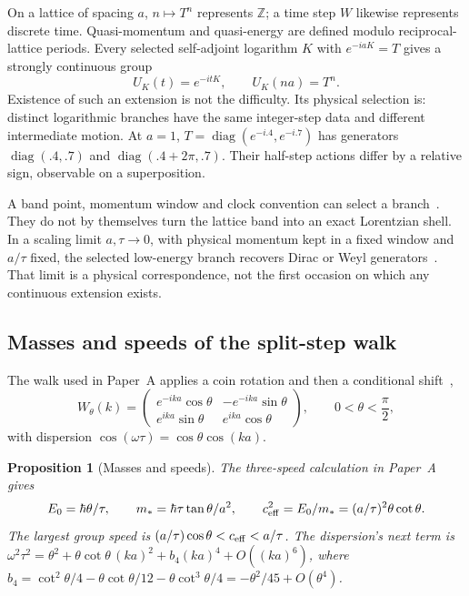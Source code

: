 \documentclass[12pt,a4paper]{article}
\newtheorem{proposition}[theorem]{Proposition}
\theoremstyle{definition}
\theoremstyle{remark}
\begin{document}
On a lattice of spacing $a$, $n\mapsto T^n$ represents $\mathbb Z$; a time step $W$ likewise represents discrete time. Quasi-momentum and quasi-energy are defined modulo reciprocal-lattice periods. Every selected self-adjoint logarithm $K$ with $e^{-iaK}=T$ gives a strongly continuous group
\[
 U_K(t)=e^{-itK},\qquad U_K(na)=T^n .
\]
Existence of such an extension is not the difficulty. Its physical selection is: distinct logarithmic branches have the same integer-step data and different intermediate motion. At $a=1$, $T=\operatorname{diag}(e^{-i.4},e^{-i.7})$ has generators $\operatorname{diag}(.4,.7)$ and $\operatorname{diag}(.4+2\pi,.7)$. Their half-step actions differ by a relative sign, observable on a superposition.

A band point, momentum window and clock convention can select a branch~\cite{Liu2026QRAIFA}. They do not by themselves turn the lattice band into an exact Lorentzian shell. In a scaling limit $a,\tau\to0$, with physical momentum kept in a fixed window and $a/\tau$ fixed, the selected low-energy branch recovers Dirac or Weyl generators~\cite{Strauch2006,BisioDArianoTosini2015,DArianoPerinotti2014}. That limit is a physical correspondence, not the first occasion on which any continuous extension exists.

\subsection{Masses and speeds of the split-step walk}

The walk used in Paper~A applies a coin rotation and then a conditional shift~\cite{Liu2026QRAIFA},
\begin{equation}
W_\theta(k)=\begin{pmatrix}e^{-ika}\cos\theta&-e^{-ika}\sin\theta\\ e^{ika}\sin\theta&e^{ika}\cos\theta\end{pmatrix},\qquad 0<\theta<\frac\pi2 ,
\end{equation}
with dispersion $\cos(\omega\tau)=\cos\theta\cos(ka)$.

\begin{proposition}[Masses and speeds]
\label{prop:walk}
The three-speed calculation in Paper~A~\cite[Proposition on three speeds]{Liu2026QRAIFA} gives
\[
 E_0=\hbar\theta/\tau,\qquad m_*=\hbar\tau\tan\theta/a^2,\qquad
 c_{\rm eff}^2=E_0/m_*=(a/\tau)^2\theta\cot\theta.
\]
The largest group speed is $(a/\tau)\cos\theta<c_{\rm eff}<a/\tau$.
The dispersion's next term is
$\omega^2\tau^2=\theta^2+\theta\cot\theta\,(ka)^2+b_4(ka)^4+O((ka)^6)$,
where
$b_4=\cot^2\theta/4-\theta\cot\theta/12-\theta\cot^3\theta/4
=-\theta^2/45+O(\theta^4)$.
\end{proposition}
\end{document}
